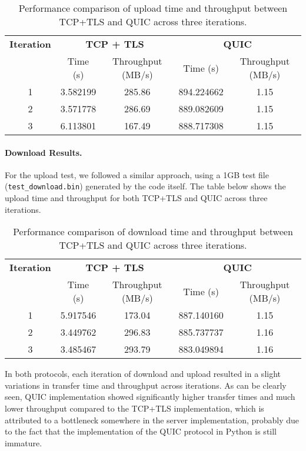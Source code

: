 \begin{table}[!h]
\centering
\begin{tabular}{ccccc}
\toprule
\textbf{Iteration} & \multicolumn{2}{c}{\textbf{TCP + TLS}} & \multicolumn{2}{c}{\textbf{QUIC}} \\
& Time (s) & Throughput (MB/s) & Time (s) & Throughput (MB/s) \\
\midrule
1 & 3.582199 & 285.86 & 894.224662 & 1.15 \\
2 & 3.571778 & 286.69 & 889.082609 & 1.15 \\
3 & 6.113801 & 167.49 & 888.717308 & 1.15 \\
\bottomrule
\end{tabular}
\caption{Performance comparison of upload time and throughput between TCP+TLS and QUIC across three iterations.}
\end{table}

\paragraph{Download Results.} For the upload test, we followed a similar approach, using a 1GB test file (\texttt{test\_download.bin}) generated by the code itself. The table below shows the upload time and throughput for both TCP+TLS and QUIC across three iterations.

\begin{table}[!h]
\centering
\begin{tabular}{ccccc}
\toprule
\textbf{Iteration} & \multicolumn{2}{c}{\textbf{TCP + TLS}} & \multicolumn{2}{c}{\textbf{QUIC}} \\
& Time (s) & Throughput (MB/s) & Time (s) & Throughput (MB/s) \\
\midrule
1 & 5.917546 & 173.04 & 887.140160 & 1.15 \\
2 & 3.449762 & 296.83 & 885.737737 & 1.16 \\
3 & 3.485467 & 293.79 & 883.049894 & 1.16 \\
\bottomrule
\end{tabular}
\caption{Performance comparison of download time and throughput between TCP+TLS and QUIC across three iterations.}
\end{table}

\noindent In both protocols, each iteration of download and upload resulted in a slight variations in transfer time and throughput across iterations. As can be clearly seen, QUIC implementation showed significantly higher transfer times and much lower throughput compared to the TCP+TLS implementation, which is attributed to a bottleneck somewhere in the server implementation, probably due to the fact that the implementation of the QUIC protocol in Python is still immature.

